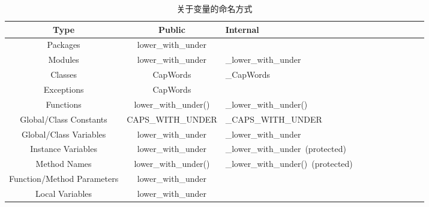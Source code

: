 \documentclass{article}
\begin{document}
\begin{table}[!htbp]
   \centering
   \begin{tabular}{ccccccccccc}
   \toprule  
\textcolor[rgb]{0.141, 0.161, 0.180}{Type} & \textcolor[rgb]{0.141, 0.161, 0.180}{Public} & \multicolumn{1}{l}{\textcolor[rgb]{0.141, 0.161, 0.180}{Internal}} \\
\midrule
\textcolor[rgb]{0.141, 0.161, 0.180}{Packages} & \textcolor[rgb]{0.141, 0.161, 0.180}{lower\_with\_under} & \textcolor[rgb]{0.141, 0.161, 0.180}{} \\
\textcolor[rgb]{0.141, 0.161, 0.180}{Modules} & \textcolor[rgb]{0.141, 0.161, 0.180}{lower\_with\_under} & \multicolumn{1}{l}{\textcolor[rgb]{0.141, 0.161, 0.180}{\_lower\_with\_under}} \\
\textcolor[rgb]{0.141, 0.161, 0.180}{Classes} & \textcolor[rgb]{0.141, 0.161, 0.180}{CapWords} & \multicolumn{1}{l}{\textcolor[rgb]{0.141, 0.161, 0.180}{\_CapWords}} \\
\textcolor[rgb]{0.141, 0.161, 0.180}{Exceptions} & \textcolor[rgb]{0.141, 0.161, 0.180}{CapWords} & \textcolor[rgb]{0.141, 0.161, 0.180}{} \\
\textcolor[rgb]{0.141, 0.161, 0.180}{Functions} & \textcolor[rgb]{0.141, 0.161, 0.180}{lower\_with\_under()} & \multicolumn{1}{l}{\textcolor[rgb]{0.141, 0.161, 0.180}{\_lower\_with\_under()}} \\
\textcolor[rgb]{0.141, 0.161, 0.180}{Global/Class Constants} & \textcolor[rgb]{0.141, 0.161, 0.180}{CAPS\_WITH\_UNDER} & \multicolumn{1}{l}{\textcolor[rgb]{0.141, 0.161, 0.180}{\_CAPS\_WITH\_UNDER}} \\
\textcolor[rgb]{0.141, 0.161, 0.180}{Global/Class Variables} & \textcolor[rgb]{0.141, 0.161, 0.180}{lower\_with\_under} & \multicolumn{1}{l}{\textcolor[rgb]{0.141, 0.161, 0.180}{\_lower\_with\_under}} \\
\textcolor[rgb]{0.141, 0.161, 0.180}{Instance Variables} & \textcolor[rgb]{0.141, 0.161, 0.180}{lower\_with\_under} & \multicolumn{1}{l}{\textcolor[rgb]{0.141, 0.161, 0.180}{\_lower\_with\_under (protected)}} \\
\textcolor[rgb]{0.141, 0.161, 0.180}{Method Names} & \textcolor[rgb]{0.141, 0.161, 0.180}{lower\_with\_under()} & \multicolumn{1}{l}{\textcolor[rgb]{0.141, 0.161, 0.180}{\_lower\_with\_under() (protected)}} \\
\textcolor[rgb]{0.141, 0.161, 0.180}{Function/Method Parameters} & \textcolor[rgb]{0.141, 0.161, 0.180}{lower\_with\_under} & \textcolor[rgb]{0.141, 0.161, 0.180}{} \\
\textcolor[rgb]{0.141, 0.161, 0.180}{Local Variables} & \textcolor[rgb]{0.141, 0.161, 0.180}{lower\_with\_under} &  \\
\bottomrule
\end{tabular}
\caption{关于变量的命名方式}
\end{table}
\end{document}
